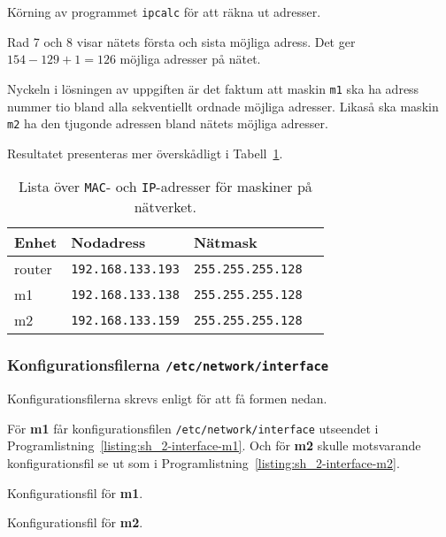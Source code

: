 \begin{listing}[H]
  \caption{Körning av programmet \texttt{ipcalc} för att räkna ut adresser.}
  \label{listing:sh_2-ipcalc}
\end{listing}

Rad 7 och 8 visar nätets första och sista möjliga adress.
Det ger $154 - 129 + 1 = 126$ möjliga adresser på nätet.

Nyckeln i lösningen av uppgiften är det faktum att maskin \texttt{m1} ska ha
adress nummer tio bland alla sekventiellt ordnade möjliga adresser. Likaså ska
maskin \texttt{m2} ha den tjugonde adressen bland nätets möjliga adresser.


Resultatet presenteras mer överskådligt i Tabell~\ref{table:interface-config}.
\begin{table}[]
  \centering
  \caption{Lista över \texttt{MAC}- och \texttt{IP}-adresser för maskiner på
           nätverket.}
  \label{table:interface-config}
  \begin{tabular}{@{}llll@{}}
    \toprule
    Enhet  & Nodadress                & Nätmask                  \\ \midrule
    router & \texttt{192.168.133.193} & \texttt{255.255.255.128} \\
    m1     & \texttt{192.168.133.138} & \texttt{255.255.255.128} \\
    m2     & \texttt{192.168.133.159} & \texttt{255.255.255.128} \\ \bottomrule
  \end{tabular}
\end{table}


\subsubsection{Konfigurationsfilerna \texttt{/etc/network/interface}}
Konfigurationsfilerna skrevs enligt \cite{debian:network} för att få formen
nedan.

För \textbf{m1} får konfigurationsfilen \texttt{/etc/network/interface}
utseendet i Programlistning~\ref{listing:sh_2-interface-m1}.  Och för
\textbf{m2} skulle motsvarande konfigurationsfil se ut som i
Programlistning~\ref{listing:sh_2-interface-m2}.


\begin{listing}[H]
  \caption{Konfigurationsfil för \textbf{m1}.}
  \label{listing:sh_2-interface-m1}
\end{listing}

\begin{listing}[H]
  \caption{Konfigurationsfil för \textbf{m2}.}
  \label{listing:sh_2-interface-m2}
\end{listing}
